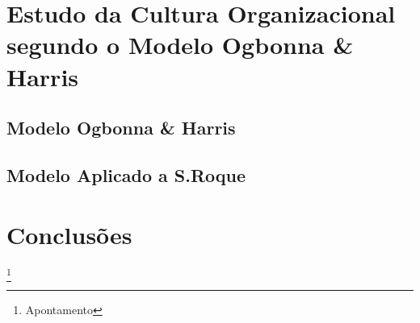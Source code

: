 \section{Estudo da Cultura Organizacional segundo o Modelo Ogbonna \& Harris}
\subsection{Modelo Ogbonna \& Harris}
\subsection{Modelo Aplicado a S.Roque}
\section{Conclusões}
\newpage
%
%
\listoffigures
\cite{*}

\newpage
\footnote{Apontamento}

